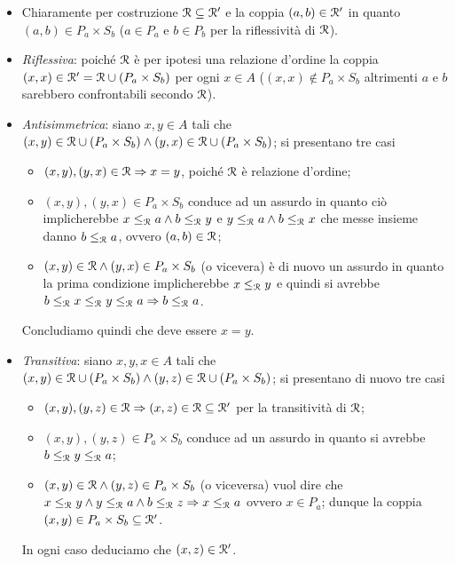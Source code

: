 \begin{itemize}
\item Chiaramente per costruzione $ \mathcal{R} \subseteq \mathcal{R}' $ e la coppia $ (a, b) \in \mathcal{R}' $ in quanto $ (a, b) \in P_a \times S_b $ ($ a \in P_a $ e $ b \in P_b $ per la riflessività di $ \mathcal{R} $).
\item \emph{Riflessiva}: poiché $ \mathcal{R} $ è per ipotesi una relazione d'ordine la coppia $ (x, x) \in \mathcal{R}' = \mathcal{R} \cup (P_a \times S_b) $ per ogni $ x \in A $ ($ (x, x) \notin P_a \times S_b $ altrimenti $ a $ e $ b $ sarebbero confrontabili secondo $ \mathcal{R} $).
\item \emph{Antisimmetrica}: siano $ x, y \in A $ tali che $ (x, y) \in \mathcal{R} \cup (P_a \times S_b) \wedge (y, x) \in \mathcal{R} \cup (P_a \times S_b) $; si presentano tre casi
  \begin{itemize}
  \item $ (x, y), (y, x) \in \mathcal{R} \Rightarrow x = y $, poiché $ \mathcal{R} $ è relazione d'ordine;
  \item $ (x, y), (y, x) \in P_a \times S_b $ conduce ad un assurdo in quanto ciò implicherebbe $ x \leq_{\mathcal{R}} a \wedge b \leq_{\mathcal{R}} y $ e $ y \leq_{\mathcal{R}} a \wedge b \leq_{\mathcal{R}} x $ che messe insieme danno $ b \leq_{\mathcal{R}} a $, ovvero $ (a, b) \in \mathcal{R} $;
  \item $ (x, y) \in \mathcal{R} \wedge (y, x) \in P_a \times S_b $ (o vicevera) è di nuovo un assurdo in quanto la prima condizione implicherebbe $ x \leq_{\mathcal{R}} y $ e quindi si avrebbe $ b \leq_{\mathcal{R}} x \leq_{\mathcal{R}} y \leq_{\mathcal{R}} a \Rightarrow b \leq_{\mathcal{R}} a $.
  \end{itemize}
  Concludiamo quindi che deve essere $ x = y $.
\item \emph{Transitiva}: siano $ x, y, x \in A $ tali che $ (x, y) \in \mathcal{R} \cup (P_a \times S_b) \wedge (y, z) \in \mathcal{R} \cup (P_a \times S_b) $; si presentano di nuovo tre casi
  \begin{itemize}
  \item $ (x, y), (y, z) \in \mathcal{R} \Rightarrow (x, z) \in \mathcal{R} \subseteq \mathcal{R}' $ per la transitività di $ \mathcal{R} $;
  \item $ (x, y), (y, z) \in P_a \times S_b $ conduce ad un assurdo in quanto si avrebbe $ b \leq_{\mathcal{R}} y \leq_{\mathcal{R}} a $;
  \item $ (x, y) \in \mathcal{R} \wedge (y, z) \in P_a \times S_b $ (o viceversa) vuol dire che $ x \leq_{\mathcal{R}} y \wedge y \leq_{\mathcal{R}} a \wedge b \leq_{\mathcal{R}} z \Rightarrow x \leq_{\mathcal{R}} a $ ovvero $ x \in P_a $; dunque la coppia $ (x, y) \in P_a \times S_b \subseteq \mathcal{R}' $.
  \end{itemize}
  In ogni caso deduciamo che $ (x, z) \in \mathcal{R}' $.
\end{itemize}

